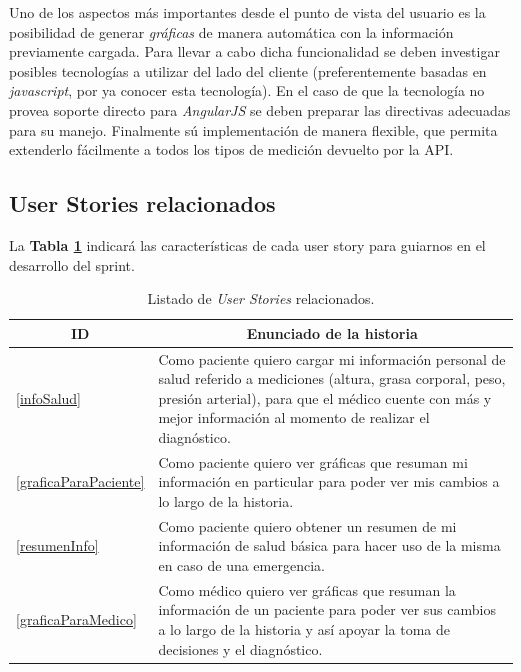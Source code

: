 Uno de los aspectos más importantes desde el punto de vista del usuario es la posibilidad de generar \textit{gráficas} de manera automática con la información previamente cargada. Para llevar a cabo dicha funcionalidad se deben investigar posibles tecnologías a utilizar del lado del cliente (preferentemente basadas en \textit{javascript}, por ya conocer esta tecnología). En el caso de que la tecnología no provea soporte directo para \textit{AngularJS} se deben preparar las directivas adecuadas para su manejo. Finalmente sú implementación de manera flexible, que permita extenderlo fácilmente a todos los tipos de medición devuelto por la API.

\subsection{User Stories relacionados}
La \textbf{Tabla \ref{US-Sprint4}} indicará las características de cada user story para guiarnos en el desarrollo del sprint.

\begin{table}[h]
    \centering
	\begin{tabular}{|l|p{14cm}|}
	\hline
        \multicolumn{1}{|c|}{\textbf{ID}} &
        \multicolumn{1}{|c|}{\textbf{Enunciado de la historia}} \\          
    \hline
       \ref{infoSalud} &
       Como paciente quiero cargar mi información personal de salud referido a mediciones (altura, grasa corporal, peso, presión arterial), para que el médico cuente con más y mejor información al momento de realizar el diagnóstico. 
    
       
       \\
       \hline
	    \ref{graficaParaPaciente} &
	    Como paciente quiero ver gráficas que resuman mi información en particular para poder ver mis cambios a lo largo de la historia. 

	    
	    \\
	    \hline
	    \ref{resumenInfo} &
	    Como paciente quiero obtener un resumen de mi información de salud básica para hacer uso de la misma en caso de una emergencia. 

	    
	    \\
	   \hline      
        \ref{graficaParaMedico} & Como médico quiero ver gráficas que resuman la información de un paciente para poder ver sus cambios a lo largo de la historia y así apoyar la toma de decisiones y el diagnóstico.\\
    \hline
    \end{tabular}
    \caption{Listado de \textit{User Stories} relacionados.}
    \label{US-Sprint4}
\end{table}

